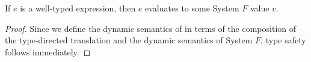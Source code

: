 \begin{theorem}
  If $e$ is a well-typed \name expression, then $e$ evaluates to some System $F$
  value $v$.
\end{theorem}
\begin{proof}
  Since we define the dynamic semantics of \name in terms of the composition of
  the type-directed translation and the dynamic semantics of System $F$, type safety follows immediately.
\end{proof}